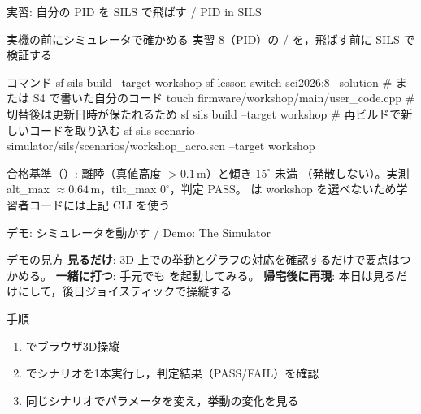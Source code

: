 \begin{frame}[fragile]{実習: 自分の PID を SILS で飛ばす / PID in SILS}
  \begin{block}{実機の前にシミュレータで確かめる}\small
    実習 8（PID）の / を，飛ばす前に SILS で検証する
  \end{block}

  \begin{sflisting}[basicstyle=\ttfamily\scriptsize]{コマンド}
sf sils build --target workshop
sf lesson switch sci2026:8 --solution   # または S4 で書いた自分のコード
touch firmware/workshop/main/user_code.cpp   # 切替後は更新日時が保たれるため
sf sils build --target workshop         # 再ビルドで新しいコードを取り込む
sf sils scenario simulator/sils/scenarios/workshop_acro.scn --target workshop
  \end{sflisting}

  \vspace{-2.5mm}

  {\scriptsize 合格基準（）: 離陸（真値高度 $>0.1$\,m）と傾き $15^\circ$ 未満
  （発散しない）。実測 alt\_max $\approx 0.64$\,m，tilt\_max $0^\circ$，判定 PASS。
    は workshop を選べないため学習者コードには上記 CLI を使う}
\end{frame}

\begin{frame}{デモ: シミュレータを動かす / Demo: The Simulator}
  \begin{exampleblock}{デモの見方}\footnotesize
    \textbf{見るだけ}: 3D 上での挙動とグラフの対応を確認するだけで要点はつかめる。
    \textbf{一緒に打つ}: 手元でも  を起動してみる。
    \textbf{帰宅後に再現}: 本日は見るだけにして，後日ジョイスティックで操縦する
  \end{exampleblock}

  \vspace{0.5em}

  \begin{block}{手順}\footnotesize
    \begin{enumerate}
      \item {} でブラウザ3D操縦
      \item {} でシナリオを1本実行し，判定結果（PASS/FAIL）を確認
      \item 同じシナリオでパラメータを変え，挙動の変化を見る
    \end{enumerate}
  \end{block}
\end{frame}

